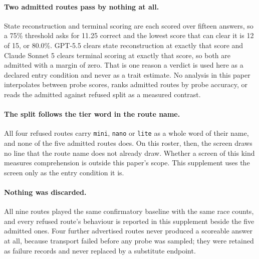 \documentclass[sigconf,anonymous]{aamas}
\begin{document}
\paragraph{Two admitted routes pass by nothing at all.} State reconstruction
and terminal scoring are each scored over fifteen answers, so a 75\% threshold
asks for 11.25 correct and the lowest score that can clear it is 12 of 15, or
80.0\%. GPT-5.5 clears state reconstruction at exactly that score and Claude
Sonnet 5 clears terminal scoring at exactly that score, so both are admitted
with a margin of zero. That is one reason a verdict is used here as a declared
entry condition and never as a trait estimate. No analysis in this paper
interpolates between probe scores, ranks admitted routes by probe accuracy, or
reads the admitted against refused split as a measured contrast.

\paragraph{The split follows the tier word in the route name.} All four
refused routes carry \texttt{mini}, \texttt{nano} or \texttt{lite} as a whole
word of their name, and none of the five admitted routes does. On this roster,
then, the screen draws no line that the route name does not already draw.
Whether a screen of this kind measures comprehension is outside this paper's
scope. This supplement uses the screen only as the entry condition it is.

\paragraph{Nothing was discarded.} All nine routes played the same confirmatory
baseline with the same race counts, and every refused route's behaviour is
reported in this supplement beside the five admitted ones. Four further
advertised routes never produced a scoreable answer at all, because transport
failed before any probe was sampled; they were retained as failure records and
never replaced by a substitute endpoint.
\end{document}

